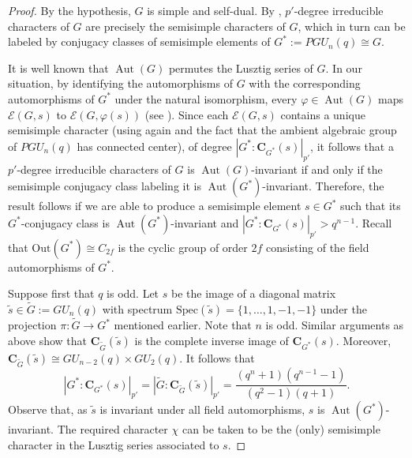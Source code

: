 \documentclass[12pt]{amsart}
\theoremstyle{plain}
\theoremstyle{definition}
\numberwithin{equation}{section}
\newcommand{\Aut}{\operatorname{Aut}}
\newcommand{\FF}{\mathbb{F}}
\newcommand{\Out}{{\mathrm {Out}}}
\newcommand{\Spec}{{\mathrm {Spec}}}
\newcommand{\bC}{{\mathbf{C}}}
\begin{document}
\begin{proof}
By the hypothesis, $G$ is simple and self-dual. By
\cite[Lemma~5]{Brunat09}, $p'$-degree irreducible characters of $G$
are precisely the semisimple characters of $G$, which in turn can be
labeled by conjugacy classes of semisimple elements of
$G^*:=PGU_n(q)\cong G$.

It is well known that $\Aut(G)$ permutes the Lusztig series of $G$.
In our situation, by identifying the automorphisms of $G$ with the
corresponding automorphisms of $G^*$ under the natural isomorphism,
every $\varphi\in\Aut(G)$ maps $\mathcal{E}(G,s)$ to
$\mathcal{E}(G,\varphi(s))$ (see \cite[Proposition~7.2]{Taylor18}).
Since each $\mathcal{E}(G,s)$ contains a unique semisimple character
(using again \cite[p.~171]{GM20} and the fact that the ambient
algebraic group of $PGU_n(q)$ has connected center), of degree
$|G^*:\bC_{G^*}(s)|_{p'}$, it follows that a $p'$-degree irreducible
characters of $G$ is $\Aut(G)$-invariant if and only if the
semisimple conjugacy class labeling it is $\Aut(G^*)$-invariant.
Therefore, the result follows if we are able to produce a semisimple
element $s\in G^*$ such that its $G^*$-conjugacy class is
$\Aut(G^*)$-invariant and $|G^*:\bC_{G^*}(s)|_{p'}>q^{n-1}$. Recall
that $\Out(G^*)\cong C_{2f}$ is the cyclic group of order $2f$
consisting of the field automorphisms of $G^*$.

Suppose first that $q$ is odd. Let $s$ be the image of a diagonal
matrix $\widetilde{s}\in \widetilde{G}:=GU_n(q)$ with spectrum
$\Spec(\widetilde{s})=\{1,\ldots,1,-1,-1\}$ under the projection
$\pi:\widetilde{G}\to G^*$ mentioned earlier. Note that $n$ is odd.
Similar arguments as above show that
$\bC_{\widetilde{G}}(\widetilde{s})$ is the complete inverse image
of $\bC_{G^*}(s)$. Moreover,
$\bC_{\widetilde{G}}(\widetilde{s})\cong GU_{n-2}(q)\times GU_2(q)$.
It follows that
\[
|G^*:\bC_{G^*}(s)|_{p'}=|\widetilde{G}:\bC_{\widetilde{G}}(\widetilde{s})|_{p'}
=\frac{(q^n+1)(q^{n-1}-1)}{(q^2-1)(q+1)}.
\]
Observe that, as $\widetilde{s}$ is invariant under all field
automorphisms, $s$ is $\Aut(G^*)$-invariant. The required character
$\chi$ can be taken to be the (only) semisimple character in the
Lusztig series associated to $s$.



\end{proof}
\end{document}
